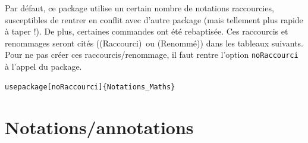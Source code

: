 \documentclass[a4paper,10pt]{article}
\newcommand{\rac}{({\color{red}Raccourci})}
\newcommand{\ren}{({\color{blue}Renommé})}
\begin{document}
	Par défaut, ce package utilise un certain nombre de notations raccourcies, susceptibles de rentrer en conflit avec d'autre package (mais tellement plus rapide à taper !).
	De plus, certaines commandes ont été rebaptisée.
	Ces raccourcis et renommages seront cités (\rac\ ou \ren) dans les tableaux suivants.
	Pour ne pas créer ces raccourcis/renommage, il faut rentre l'option \verb!noRaccourci! à l'appel du package.

	\begin{verbatim}
usepackage[noRaccourci]{Notations_Maths}
	\end{verbatim}

	\section{Notations/annotations}
	\noindent
\end{document}
